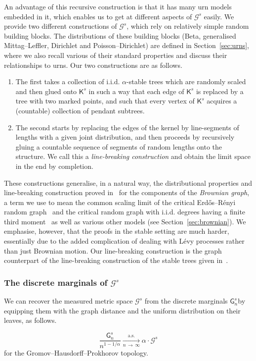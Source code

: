 \documentclass[AHL,Unicode,longabstracts,published]{cedram}
\newcommand{\cG}{\mathcal{G}}
\newcommand{\sG}{\mathsf{G}}
\newcommand{\sK}{\mathsf{K}}
\begin{document}
An advantage of this recursive construction is that it has many urn models embedded in it, which enables us to get at different aspects of $\cG^s$ easily. We provide two different constructions of $\cG^s$, which rely on relatively simple random building blocks. The distributions of these building blocks (Beta, generalised Mittag--Leffler, Dirichlet and Poisson--Dirichlet) are defined in Section~\ref{sec:urns}, where we also recall various of their standard properties and discuss their relationships to urns. Our two constructions are as follows.
\begin{enumerate}
\item The first takes a collection of i.i.d. $\alpha$-stable trees which are randomly scaled and then glued onto $\sK^s$ in such a way that each edge of $\sK^s$ is replaced by a tree with two marked points, and such that every vertex of $\sK^s$ acquires a (countable) collection of pendant subtrees.
\item The second starts by replacing the edges of the kernel by line-segments of lengths with a given joint distribution, and then proceeds by recursively gluing a countable sequence of segments of random lengths onto the structure. We call this a \emph{line-breaking construction} and obtain the limit space in the end by completion.
\end{enumerate}

These constructions generalise, in a natural way, the distributional properties and line-breaking construction proved in~\cite{ABBrGo} for the components of the \emph{Brownian graph}, a term we use to mean the common scaling limit of the critical Erd\H{o}s--Rényi random graph~\cite{ABBrGo12} and the critical random graph with i.i.d. degrees having a finite third moment~\cite{BS16+} as well as various other models (see Section~\ref{sec:brownian}). We emphasise, however, that the proofs in the stable setting are much harder, essentially due to the added complication of dealing with Lévy processes rather than just Brownian motion. Our line-breaking construction is the graph counterpart of the line-breaking construction of the stable trees given in~\cite{GHlinebreaking}.

\subsubsection{The discrete marginals of \texorpdfstring{$\cG^s$}{Gs}}\label{sec:marginalsintro}

We can recover the measured metric space $\cG^s$ from the discrete marginals $\sG_{n}^s$\linebreak by equipping them with the graph distance and the uniform distribution on their leaves, as follows.
\begin{prop}\label{prop:approx}
\[
\frac{\sG_n^s}{n^{1-1/\alpha}} \underset{n \,\rightarrow\,\infty}{\overset{\text{a.s.}}\longrightarrow} \alpha \cdot \cG^s
\]
for the Gromov--Hausdorff--Prokhorov topology.
\end{prop}
\end{document}
